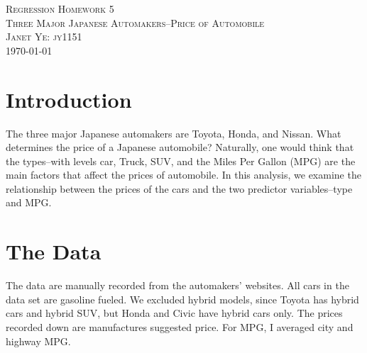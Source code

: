 \documentclass[a4 paper, 11 pt]{article}
\begin{document}
\begin{titlepage}
\begin{center}
\textsc{\huge Regression Homework 5} \\ [0.5cm]
\textsc{\huge Three Major Japanese Automakers--Price of Automobile}\\ [1.5cm]
\textsc{\large Janet Ye: jy1151} \\
\vfill
{\large \today}
\end{center}
\end{titlepage}

\section{Introduction}
The three major Japanese automakers are Toyota, Honda, and Nissan. What determines the price of a Japanese automobile? Naturally, one would think that the types--with levels car, Truck, SUV, and the Miles Per Gallon (MPG) are the main factors that affect the prices of automobile. In this analysis, we examine the relationship between the prices of the cars and the two predictor variables--type and MPG.
\section{The Data}
The data are manually recorded from the automakers' websites. All cars in the data set are gasoline fueled. We excluded hybrid models, since Toyota has hybrid cars and hybrid SUV, but Honda and Civic have hybrid cars only. The prices recorded down are manufactures suggested price. For MPG, I averaged city and highway MPG.
\end{document}
